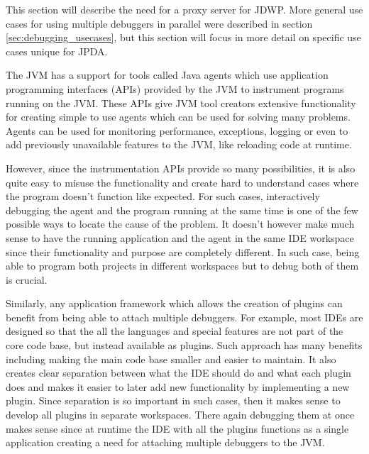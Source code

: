\documentclass[..thesis.tex]{subfiles}
\begin{document}
This section will describe the need for a proxy server for JDWP.
More general use cases for using multiple debuggers in parallel were described in section \ref{sec:debugging_usecases}, but this section will focus in more detail on specific use cases unique for JPDA.

The JVM has a support for tools called Java agents which use application programming interfaces (APIs) provided by the JVM to instrument programs running on the JVM.
These APIs give JVM tool creators extensive functionality for creating simple to use agents which can be used for solving many problems.
Agents can be used for monitoring performance, exceptions, logging or even to add previously unavailable features to the JVM, like reloading code at runtime.

However, since the instrumentation APIs provide so many possibilities, it is also quite easy to misuse the functionality and create hard to understand cases where the program doesn't function like expected.
For such cases, interactively debugging the agent and the program running at the same time is one of the few possible ways to locate the cause of the problem.
It doesn't however make much sense to have the running application and the agent in the same IDE workspace since their functionality and purpose are completely different.
In such case, being able to program both projects in different workspaces but to debug both of them is crucial.

Similarly, any application framework which allows the creation of plugins can benefit from being able to attach multiple debuggers.
For example, most IDEs are designed so that the all the languages and special features are not part of the core code base, but instead available as plugins. 
Such approach has many benefits including making the main code base smaller and easier to maintain.
It also creates clear separation between what the IDE should do and what each plugin does and makes it easier to later add new functionality by implementing a new plugin.
Since separation is so important in such cases, then it makes sense to develop all plugins in separate workspaces.
There again debugging them at once makes sense since at runtime the IDE with all the plugins functions as a single application creating a need for attaching multiple debuggers to the JVM.
\end{document}
